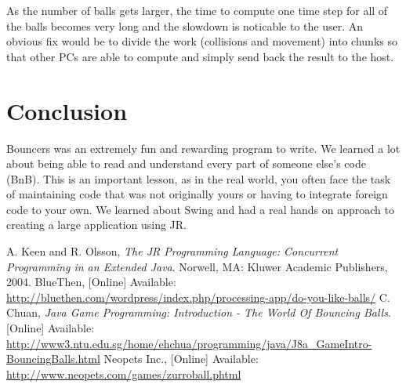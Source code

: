 \documentclass[11pt]{article}
\begin{document}
As the number of balls gets larger, the time to compute one time step for all
of the balls becomes very long and the slowdown is noticable to the user.  An
obvious fix would be to divide the work (collisions and movement) into chunks
so that other PCs are able to compute and simply send back the result to the 
host.

\section{Conclusion}
Bouncers was an extremely fun and rewarding program to write.  We learned
a lot about being able to read and understand every part of someone else's code
(BnB).  This is an important lesson, as in the real world, you often face the
task of maintaining code that was not originally yours or having to integrate
foreign code to your own.  We learned about Swing and had a real hands on 
approach to creating a large application using JR.


\begin{thebibliography}{9}
	  A. Keen and R. Olsson,  %
	  \emph{The JR Programming Language:  Concurrent Programming in an 
	  			Extended Java}.	%
		Norwell, MA:	%
		Kluwer Academic Publishers,	%
		2004.	%
		BlueThen,
		[Online]
		Available:
		\url{http://bluethen.com/wordpress/index.php/processing-app/do-you-like-balls/}
		C. Chuan,
	  \emph{Java Game Programming: Introduction - The World Of Bouncing Balls}.	%
		[Online]
		Available:
		\url{http://www3.ntu.edu.sg/home/ehchua/programming/java/J8a_GameIntro-BouncingBalls.html}
		Neopets Inc.,
		[Online]
		Available:
		\url{http://www.neopets.com/games/zurroball.phtml}
\end{thebibliography}
\end{document}
